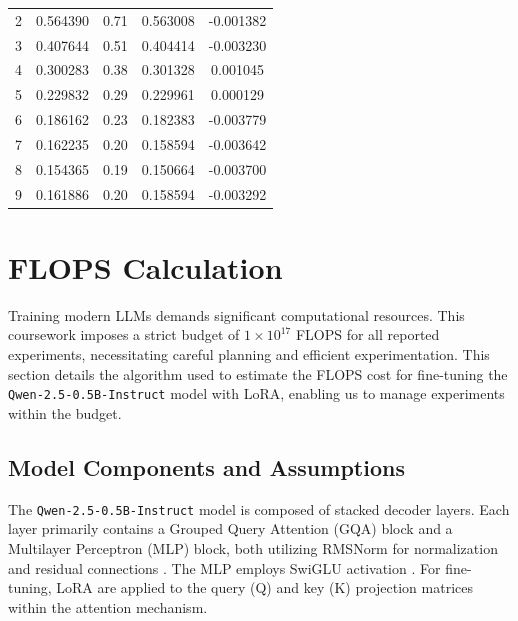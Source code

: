 \documentclass{article}
\begin{document}
\begin{table}[!th]
\begin{minipage}{0.48\textwidth}
\begin{tabular}{ccccc}
        2 & 0.564390 & 0.71 & 0.563008 & -0.001382 \\
        3 & 0.407644 & 0.51 & 0.404414 & -0.003230 \\
        4 & 0.300283 & 0.38 & 0.301328 & 0.001045 \\
        5 & 0.229832 & 0.29 & 0.229961 & 0.000129 \\
        6 & 0.186162 & 0.23 & 0.182383 & -0.003779 \\
        7 & 0.162235 & 0.20 & 0.158594 & -0.003642 \\
        8 & 0.154365 & 0.19 & 0.150664 & -0.003700 \\
        9 & 0.161886 & 0.20 & 0.158594 & -0.003292 \\
        \bottomrule
    \end{tabular}
\end{minipage}
\end{table}






\section{FLOPS Calculation}
\label{sec:flops}

Training modern LLMs demands significant computational resources. This coursework imposes a strict budget of $1 \times 10^{17}$ FLOPS for all reported experiments, necessitating careful planning and efficient experimentation. This section details the algorithm used to estimate the FLOPS cost for fine-tuning the \texttt{Qwen-2.5-0.5B-Instruct} model with LoRA, enabling us to manage experiments within the budget.

\subsection{Model Components and Assumptions}

The \texttt{Qwen-2.5-0.5B-Instruct} model is composed of stacked decoder layers. Each layer primarily contains a Grouped Query Attention (GQA) block and a Multilayer Perceptron (MLP) block, both utilizing RMSNorm \cite{zhang2019rootmeansquarelayer} for normalization and residual connections \cite{he2015deepresiduallearningimage}. The MLP employs SwiGLU activation \cite{shazeer2020gluvariantsimprovetransformer}. For fine-tuning, LoRA \cite{hu2021loralowrankadaptationlarge} are applied to the query (Q) and key (K) projection matrices within the attention mechanism.
\end{document}
